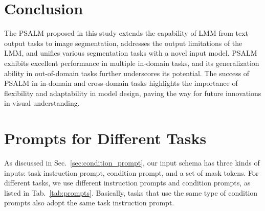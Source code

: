 \section{Conclusion}
The PSALM proposed in this study extends the capability of LMM from text output tasks to image segmentation, addresses the output limitations of the LMM, and unifies various segmentation tasks with a novel input model. PSALM exhibits excellent performance in multiple in-domain tasks, and its generalization ability in out-of-domain tasks further underscores its potential. The success of PSALM in in-domain and cross-domain tasks highlights the importance of flexibility and adaptability in model design, paving the way for future innovations in visual understanding.

\newpage
\section{Prompts for Different Tasks}
As discussed in Sec.~\ref{sec:condition_prompt}, our input schema has three kinds of inputs: task instruction prompt, condition prompt, and a set of mask tokens. 
For different tasks, we use different instruction prompts and condition prompts, as listed in Tab.~\ref{tab:prompts}. 
Basically, tasks that use the same type of condition prompts also adopt the same task instruction prompt. 

